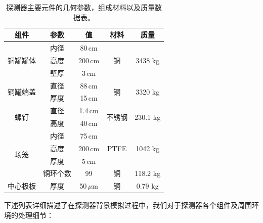 \begin{table}[thb]
    \begin{center}
        \caption{探测器主要元件的几何参数，组成材料以及质量数据表。\supercite{cdr}}
        \begin{tabular*}{0.75\textwidth}{@{\extracolsep{\fill}}ccccc}
        \hline
        \hline
        \textbf{组件} & \textbf{参数} & \textbf{值} & \textbf{材料} & \textbf{质量} \\ \hline
        \multirow{3}{*}{铜罐罐体} 
            & 内径 & 80\,cm & \multirow{3}{*}{铜} & \multirow{3}{*}{3438 kg} \\
            & 高度 & 200\,cm &  &    \\   
            & 壁厚 & 3\,cm &  &    \\\hline
        \multirow{2}{*}{铜罐端盖} 
            & 直径 & 88\,cm & \multirow{2}{*}{铜} & \multirow{2}{*}{3320 kg} \\
            & 厚度 & 15\,cm &  &    \\\hline
        \multirow{2}{*}{螺钉} 
            & 直径 & 1.4\,cm & \multirow{2}{*}{不锈钢} & \multirow{2}{*}{230.1 kg} \\
            & 高度 & 40\,cm &  &    \\\hline
        \multirow{4}{*}{场笼} 
            & 内径 & 75\,cm & \multirow{3}{*}{PTFE} & \multirow{3}{*}{1042 kg} \\
            & 高度 & 200\,cm &  & \\ 
            & 厚度 & 5\,cm &  & \\ 
            & 铜环个数 & 99 &    \multirow{1}{*}{铜}  & 118.2 kg \\\hline
        中心极板 
            & 厚度   &   50\,$\mu$m     &   \multirow{1}{*}{铜}  &    0.79 kg   \\   
        \hline
        \hline
        \end{tabular*}
        \label{tab:parameters_geometry}
    \end{center}
\end{table}
  
下述列表详细描述了在探测器背景模拟过程中，我们对于探测器各个组件及周围环境的处理细节：
\vspace{0.4cm}

